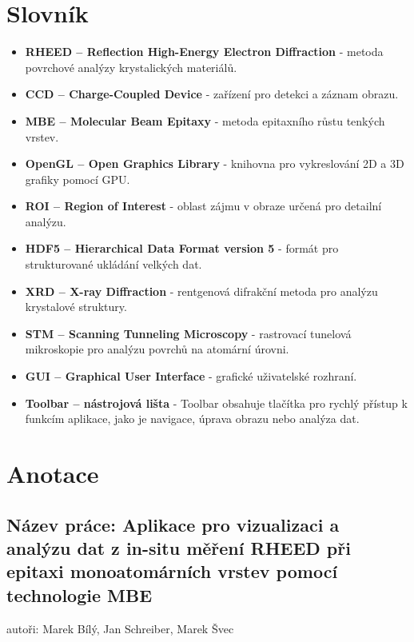 \documentclass{article}
\begin{document}
\section{Slovník}
\begin{itemize}
\item \textbf{RHEED – Reflection High-Energy Electron Diffraction} - metoda povrchové analýzy krystalických materiálů.\\
\item \textbf{CCD – Charge-Coupled Device} - zařízení pro detekci a záznam obrazu.\\
\item \textbf{MBE – Molecular Beam Epitaxy} - metoda epitaxního růstu tenkých vrstev.\\
\item \textbf{OpenGL – Open Graphics Library} - knihovna pro vykreslování 2D a 3D grafiky pomocí GPU.\\
\item \textbf{ROI – Region of Interest} - oblast zájmu v obraze určená pro detailní analýzu.\\
\item \textbf{HDF5 – Hierarchical Data Format version 5} - formát pro strukturované ukládání velkých dat.\\
\item \textbf{XRD – X-ray Diffraction} - rentgenová difrakční metoda pro analýzu krystalové struktury.\\
\item \textbf{STM – Scanning Tunneling Microscopy} - rastrovací tunelová mikroskopie pro analýzu povrchů na atomární úrovni.\\
\item \textbf{GUI – Graphical User Interface} - grafické uživatelské rozhraní.\\
\item \textbf{Toolbar – nástrojová lišta} - Toolbar obsahuje tlačítka pro rychlý přístup k funkcím aplikace, jako je navigace, úprava obrazu nebo analýza dat.
\end{itemize}
\newpage

\section*{Anotace}

\subsection*{Název práce: Aplikace pro vizualizaci a analýzu dat z in-situ měření RHEED při epitaxi monoatomárních vrstev pomocí technologie MBE}
autoři: Marek Bílý, Jan Schreiber, Marek Švec
\vspace{0.5cm}
\end{document}
